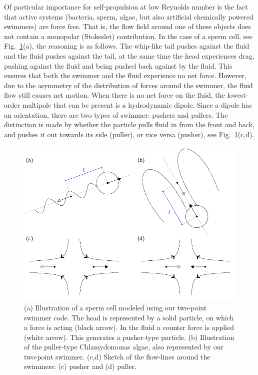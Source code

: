 \documentclass[aip,jcp,reprint,a4paper,onecolumn,amsmath]{revtex4-1}
\begin{document}
Of particular importance for self-propulsion at low Reynolds number is the fact that active systems (bacteria, sperm, algae, but also artificial chemically powered swimmers) are force free. That is, the flow field around one of these objects does not contain a monopolar (Stokeslet) contribution. In the case of a sperm cell, see Fig.~\ref{fig:pusher-puller}(a), the reasoning is as follows. The whip-like tail pushes against the fluid and the fluid pushes against the tail, at the same time the head experiences drag, pushing against the fluid and being pushed back against by the fluid. This ensures that both the swimmer and the fluid experience no net force. However, due to the asymmetry of the distribution of forces around the swimmer, the fluid flow still causes net motion. When there is no net force on the fluid, the lowest-order multipole that can be present is a hydrodynamic dipole. Since a dipole has an orientation, there are two types of swimmer: pushers and pullers. The distinction is made by whether the particle pulls fluid in from the front and back, and pushes it out towards its side (puller), or vice versa (pusher), see Fig.~\ref{fig:pusher-puller}(c,d).

\begin{figure}[!htb]
\begin{center}
\includegraphics[scale=1.0]{FIGURES/pusher-puller}
\end{center}
\caption{\label{fig:pusher-puller}(a) Illustration of a sperm cell modeled using our two-point swimmer code. The head is represented by a solid particle, on which a force is acting (black arrow). In the fluid a counter force is applied (white arrow). This generates a pusher-type particle. (b) Illustration of the puller-type Chlamydomonas algae, also represented by our two-point swimmer. (c,d) Sketch of the flow-lines around the swimmers: (c) pusher and (d) puller.}
\end{figure}
\end{document}
